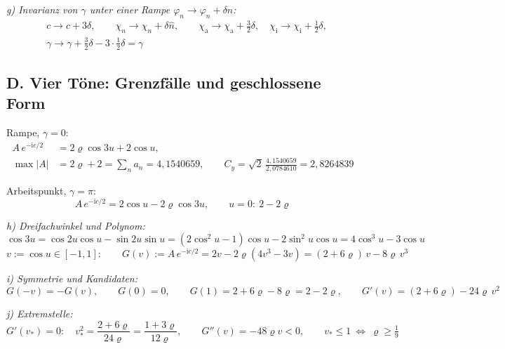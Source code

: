 \noindent\textit{g) Invarianz von $\gamma$ unter einer Rampe $\varphi_n\to\varphi_n+\delta n$:}
\begin{align}
  &c\to c+3\delta,\qquad \chi_n\to\chi_n+\delta\hat n,\qquad
  \chi_\mathrm{a}\to\chi_\mathrm{a}+\tfrac32\delta,\quad
  \chi_\mathrm{i}\to\chi_\mathrm{i}+\tfrac12\delta,\\
  &\gamma\to\gamma+\tfrac32\delta-3\cdot\tfrac12\delta = \gamma
\end{align}

\subsection*{D. Vier T\"one: Grenzf\"alle und geschlossene Form}

Rampe, $\gamma=0$:
\begin{align}
  A\,e^{-\mathrm{i}c/2} &= 2\varrho\cos3u+2\cos u,\\
  \max|A| &= 2\varrho+2 = \textstyle\sum_n a_n = 4{,}1540659,\qquad
  C_y = \sqrt2\,\frac{4{,}1540659}{2{,}0784610} = 2{,}8264839
\end{align}

Arbeitspunkt, $\gamma=\pi$:
\begin{equation}
  A\,e^{-\mathrm{i}c/2} = 2\cos u - 2\varrho\cos3u,\qquad
  u=0:\ 2-2\varrho
\end{equation}

\noindent\textit{h) Dreifachwinkel und Polynom:}
\begin{equation}
  \cos3u = \cos2u\cos u-\sin2u\sin u
         = (2\cos^2u-1)\cos u-2\sin^2u\cos u
         = 4\cos^3u-3\cos u
\end{equation}
\begin{equation}
  v:=\cos u\in[-1,1]:\qquad
  G(v) := A\,e^{-\mathrm{i}c/2} = 2v-2\varrho(4v^3-3v) = (2+6\varrho)\,v-8\varrho\,v^3
\end{equation}

\noindent\textit{i) Symmetrie und Kandidaten:}
\begin{equation}
  G(-v)=-G(v),\qquad
  G(0)=0,\qquad
  G(1)=2+6\varrho-8\varrho=2-2\varrho,\qquad
  G'(v)=(2+6\varrho)-24\varrho\,v^2
\end{equation}

\noindent\textit{j) Extremstelle:}
\begin{equation}
  G'(v_*)=0:\quad v_*^2 = \frac{2+6\varrho}{24\varrho} = \frac{1+3\varrho}{12\varrho},
  \qquad G''(v)=-48\varrho v<0,
  \qquad v_*\le1\ \Leftrightarrow\ \varrho\ge\tfrac19
\end{equation}

